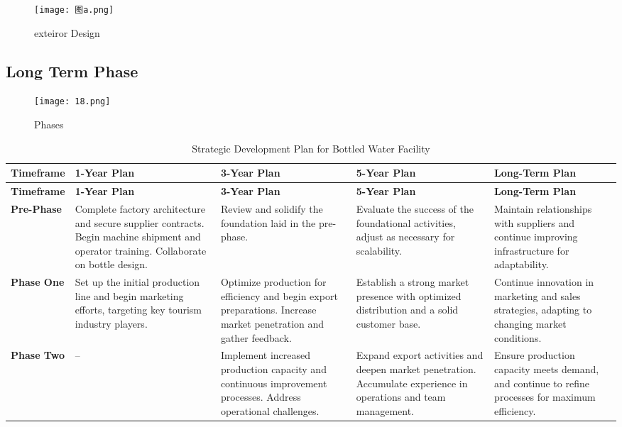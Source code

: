 \documentclass{article}
\begin{document}
\begin{figure}[H]
\centering
\texttt{[image: 图a.png]}
\caption{exteiror Design}
\label{fig:unique_label_11}
\end{figure}

\subsection{Long Term Phase}
\begin{figure}[H]
\centering
\texttt{[image: 18.png]}
\caption{Phases}
\label{fig:unique_label_11}
\end{figure}

\begin{longtable}{p{1.5cm}p{3cm}p{3cm}p{3cm}p{3cm}}
\caption{Strategic Development Plan for Bottled Water Facility} \\
\toprule
\textbf{Timeframe} & \textbf{1-Year Plan} & \textbf{3-Year Plan} & \textbf{5-Year Plan} & \textbf{Long-Term Plan} \\
\midrule
\endfirsthead
\toprule
\textbf{Timeframe} & \textbf{1-Year Plan} & \textbf{3-Year Plan} & \textbf{5-Year Plan} & \textbf{Long-Term Plan} \\
\midrule
\endhead
\bottomrule
\endfoot
\bottomrule
\endlastfoot

\textbf{Pre-Phase} & 
Complete factory architecture and secure supplier contracts. Begin machine shipment and operator training. Collaborate on bottle design. & 
Review and solidify the foundation laid in the pre-phase. & 
Evaluate the success of the foundational activities, adjust as necessary for scalability. & 
Maintain relationships with suppliers and continue improving infrastructure for adaptability. \\
\midrule

\textbf{Phase One} & 
Set up the initial production line and begin marketing efforts, targeting key tourism industry players. & 
Optimize production for efficiency and begin export preparations. Increase market penetration and gather feedback. & 
Establish a strong market presence with optimized distribution and a solid customer base. & 
Continue innovation in marketing and sales strategies, adapting to changing market conditions. \\
\midrule

\textbf{Phase Two} & 
-- & 
Implement increased production capacity and continuous improvement processes. Address operational challenges. & 
Expand export activities and deepen market penetration. Accumulate experience in operations and team management. & 
Ensure production capacity meets demand, and continue to refine processes for maximum efficiency. \\
\midrule


\end{longtable}
\end{document}
